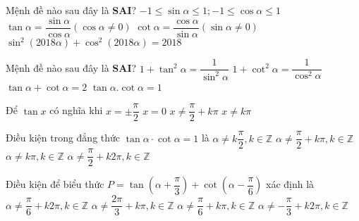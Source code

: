 \begin{ex}%
Mệnh đề nào sau đây là {\bf SAI}?
\choice
{$-1\leqslant \sin \alpha \leqslant 1;-1\leqslant \cos \alpha \leqslant 1$}
{$\tan \alpha =\dfrac{{\sin \alpha}}{{\cos \alpha}} \left({\cos \alpha \ne 0}\right)$}
{$\cot \alpha =\dfrac{{\cos \alpha}}{{\sin \alpha}} \left({\sin \alpha \ne 0}\right)$}
{\True $\sin ^2\left({2018\alpha}\right)+\cos ^2\left({2018\alpha}\right)=2018$}
\end{ex}

\begin{ex}%
Mệnh đề nào sau đây là {\bf SAI}?
\choice
{$1+\tan ^2\alpha =\dfrac{1}{{{\sin}^2\alpha}}$}
{$1+\cot ^2\alpha =\dfrac{1}{{{\cos}^2\alpha}}$}
{\True $\tan \alpha+\cot \alpha =2$}
{$\tan \alpha.\cot \alpha =1$}
\loigiai{} 
\end{ex}

\begin{ex}%
Để $\tan x$ có nghĩa khi
\choice
{$x=\pm \dfrac{\pi}{2}$}
{$x=0$}
{\True $x\ne \dfrac{\pi}{2}+k\pi$}
{$x\ne k\pi$}
\loigiai{} 
\end{ex}

\begin{ex}%
Điều kiện trong đẳng thức $\tan \alpha \cdot \cot \alpha =1$ là
\choice
{\True $\alpha \ne k\dfrac{\pi}{2}, k\in \mathbb{Z}$}
{$\alpha \ne \dfrac{\pi}{2}+k\pi, k\in \mathbb{Z}$}
{$\alpha \ne k\pi, k\in \mathbb{Z}$}
{$\alpha \ne \dfrac{\pi}{2}+k2\pi, k\in \mathbb{Z}$}
\end{ex}

\begin{ex}%
Điều kiện để biểu thức $P=\tan \left({\alpha+\dfrac{\pi}{3}}\right)+\cot \left({\alpha-\dfrac{\pi}{6}}\right)$ xác định là
\choice
{$\alpha \ne \dfrac{\pi}{6}+k2\pi,k\in \mathbb{Z}$}
{$\alpha \ne \dfrac{{2\pi}}{3}+k\pi,k\in \mathbb{Z}$}
{\True $\alpha \ne \dfrac{\pi}{6}+k\pi,k\in \mathbb{Z}$}
{$\alpha \ne-\dfrac{\pi}{3}+k2\pi,k\in \mathbb{Z}$}
\end{ex}

